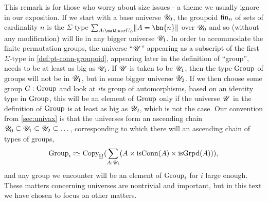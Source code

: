 \begin{remark}
  \label{rem:groupsarebig}
  This remark is for those who worry about size issues - a theme we usually ignore in our exposition.  If we
  start with a base universe ${\mathscr{U}}_0$, the groupoid $\fin_n$ of sets of cardinality $n$ is the $\Sigma$-type
  $\sum_{A:\UU_0}\Trunc{A=\bn{n}}$ over ${\mathscr{U}}_0$ and so (without any modification) will lie in any bigger
  universe ${\mathscr{U}}_1$.  In order to accommodate the finite permutation groups, the universe ``${\mathscr{U}}$'' appearing as
  a subscript of the first $\Sigma$-type in \cref{def:pt-conn-groupoid}, appearing later in the definition of
  ``group'', needs to be at least as big as ${\mathscr{U}}_1$.  If ${\mathscr{U}}$ is taken to be ${\mathscr{U}}_1$, then the type
  $\mathrm{Group}$ of groups will not be in ${\mathscr{U}}_1$, but in some bigger universe ${\mathscr{U}}_2$.  If we then choose some
  group $G:\mathrm{Group}$ and look at \emph{its} group of automorphisms, based on an identity type in
  $\mathrm{Group}$, this will be an element of $\mathrm{Group}$ only if the universe ${\mathscr{U}}$ in the definition of
  $\mathrm{Group}$ is at least as big as ${\mathscr{U}}_2$, which is not the case.  Our convention from \cref{sec:univax} is
  that the universes form an ascending chain ${\mathscr{U}}_0\subseteq{\mathscr{U}}_1\subseteq{\mathscr{U}}_2\subseteq\dots$, corresponding
  to which there will an ascending chain of types of groups,
  $$ \typegroup_i \defequi \Copy_{\mkgroup}(\sum_{A:\UU_i} ( A \times \isconn(A) \times \isgrpd(A) )), $$ and
  any group we encounter will be an element of $\mathrm{Group}_i$ for $i$ large enough.  These matters concerning
  universes are nontrivial and important, but in this text we have chosen to focus on other matters.
\end{remark}

